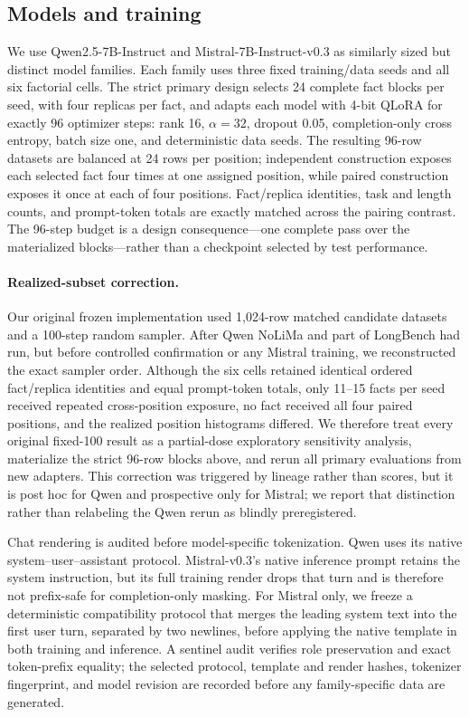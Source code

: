 \documentclass[11pt]{article}
\begin{document}
\subsection{Models and training}

We use Qwen2.5-7B-Instruct and Mistral-7B-Instruct-v0.3 as similarly sized but distinct model families. Each family uses three fixed training/data seeds and all six factorial cells. The strict primary design selects 24 complete fact blocks per seed, with four replicas per fact, and adapts each model with 4-bit QLoRA for exactly 96 optimizer steps: rank 16, $\alpha=32$, dropout 0.05, completion-only cross entropy, batch size one, and deterministic data seeds. The resulting 96-row datasets are balanced at 24 rows per position; independent construction exposes each selected fact four times at one assigned position, while paired construction exposes it once at each of four positions. Fact/replica identities, task and length counts, and prompt-token totals are exactly matched across the pairing contrast. The 96-step budget is a design consequence---one complete pass over the materialized blocks---rather than a checkpoint selected by test performance.

\paragraph{Realized-subset correction.}
Our original frozen implementation used 1,024-row matched candidate datasets and a 100-step random sampler. After Qwen NoLiMa and part of LongBench had run, but before controlled confirmation or any Mistral training, we reconstructed the exact sampler order. Although the six cells retained identical ordered fact/replica identities and equal prompt-token totals, only 11--15 facts per seed received repeated cross-position exposure, no fact received all four paired positions, and the realized position histograms differed. We therefore treat every original fixed-100 result as a partial-dose exploratory sensitivity analysis, materialize the strict 96-row blocks above, and rerun all primary evaluations from new adapters. This correction was triggered by lineage rather than scores, but it is post hoc for Qwen and prospective only for Mistral; we report that distinction rather than relabeling the Qwen rerun as blindly preregistered.

Chat rendering is audited before model-specific tokenization. Qwen uses its native system--user--assistant protocol. Mistral-v0.3's native inference prompt retains the system instruction, but its full training render drops that turn and is therefore not prefix-safe for completion-only masking. For Mistral only, we freeze a deterministic compatibility protocol that merges the leading system text into the first user turn, separated by two newlines, before applying the native template in both training and inference. A sentinel audit verifies role preservation and exact token-prefix equality; the selected protocol, template and render hashes, tokenizer fingerprint, and model revision are recorded before any family-specific data are generated.
\end{document}
